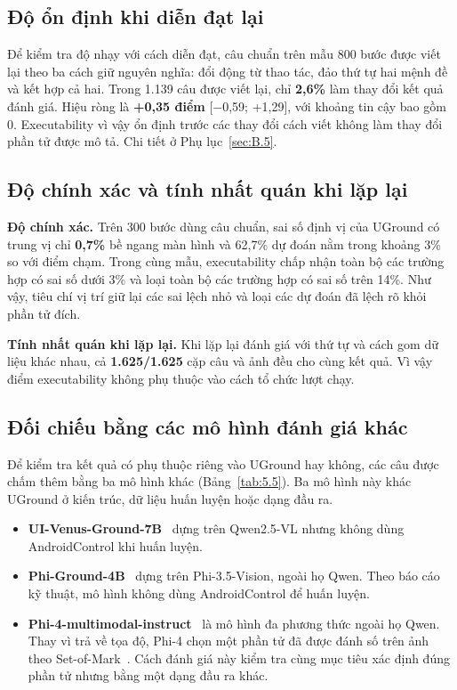 \subsection{Độ ổn định khi diễn đạt lại}\label{sec:5.8}

Để kiểm tra độ nhạy với cách diễn đạt, câu chuẩn trên mẫu 800 bước được viết lại theo ba cách giữ nguyên nghĩa: đổi động từ thao tác, đảo thứ tự hai mệnh đề và kết hợp cả hai. Trong 1.139 câu được viết lại, chỉ \textbf{2,6\%} làm thay đổi kết quả đánh giá. Hiệu ròng là \textbf{+0,35 điểm} [$-$0,59; +1,29], với khoảng tin cậy bao gồm 0. Executability vì vậy ổn định trước các thay đổi cách viết không làm thay đổi phần tử được mô tả. Chi tiết ở Phụ lục~\ref{sec:B.5}.

\subsection{Độ chính xác và tính nhất quán khi lặp lại}\label{sec:5.4}

\textbf{Độ chính xác.} Trên 300 bước dùng câu chuẩn, sai số định vị của UGround có trung vị chỉ \textbf{0,7\%} bề ngang màn hình và 62,7\% dự đoán nằm trong khoảng 3\% so với điểm chạm. Trong cùng mẫu, executability chấp nhận toàn bộ các trường hợp có sai số dưới 3\% và loại toàn bộ các trường hợp có sai số trên 14\%. Như vậy, tiêu chí vị trí giữ lại các sai lệch nhỏ và loại các dự đoán đã lệch rõ khỏi phần tử đích.

\textbf{Tính nhất quán khi lặp lại.} Khi lặp lại đánh giá với thứ tự và cách gom dữ liệu khác nhau, cả \textbf{1.625/1.625} cặp câu và ảnh đều cho cùng kết quả. Vì vậy điểm executability không phụ thuộc vào cách tổ chức lượt chạy.

\subsection{Đối chiếu bằng các mô hình đánh giá khác}\label{sec:5.9}\label{sec:5.10}

Để kiểm tra kết quả có phụ thuộc riêng vào UGround hay không, các câu được chấm thêm bằng ba mô hình khác (Bảng~\ref{tab:5.5}). Ba mô hình này khác UGround ở kiến trúc, dữ liệu huấn luyện hoặc dạng đầu ra.

\begin{itemize}
\item \textbf{UI-Venus-Ground-7B}~\cite{uivenus} dựng trên Qwen2.5-VL nhưng không dùng AndroidControl khi huấn luyện.
\item \textbf{Phi-Ground-4B}~\cite{phiground} dựng trên Phi-3.5-Vision, ngoài họ Qwen. Theo báo cáo kỹ thuật, mô hình không dùng AndroidControl để huấn luyện.
\item \textbf{Phi-4-multimodal-instruct}~\cite{phi4mini} là mô hình đa phương thức ngoài họ Qwen. Thay vì trả về tọa độ, Phi-4 chọn một phần tử đã được đánh số trên ảnh theo Set-of-Mark~\cite{setofmark}. Cách đánh giá này kiểm tra cùng mục tiêu xác định đúng phần tử nhưng bằng một dạng đầu ra khác.
\end{itemize}

